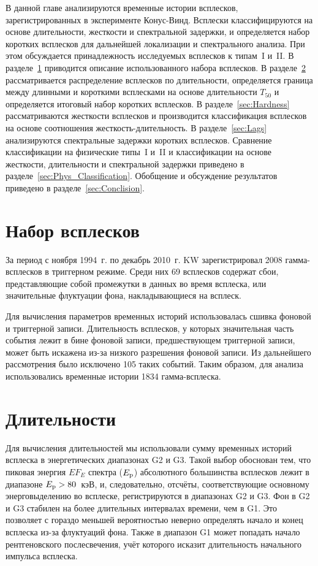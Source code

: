 В данной главе анализируются временные истории всплесков, зарегистрированных в 
эксперименте Конус-Винд. Всплески классифицируются на основе длительности, жесткости и 
спектральной задержки, и определяется набор коротких всплесков для дальнейшей локализации и спектрального анализа. 
При этом обсуждается принадлежность исследуемых всплесков к типам~I и~II. 
В разделе~\ref{sec:GRB_sample} приводится описание использованного набора всплесков. 
В разделе~\ref{sec:Durations} рассматривается распределение всплесков по длительности, 
определяется граница между длинными и короткими всплесками на основе 
длительности $T_{50}$ и определяется итоговый набор коротких всплесков. 
В разделе~\ref{sec:Hardness} рассматриваются жесткости всплесков и производится 
классификация всплесков на основе соотношения жесткость-длительность. 
В разделе~\ref{sec:Lags} анализируются спектральные задержки коротких всплесков. 
Сравнение классификации на физические типы~I и~II и классификации на основе жесткости, 
длительности и спектральной задержки приведено в разделе~\ref{sec:Phys_Classification}. 
Обобщение и обсуждение результатов приведено в разделе~\ref{sec:Conclision}.  

\section{Набор всплесков}\label{sec:GRB_sample}
За период с ноября 1994~г. по декабрь 2010~г. KW зарегистрировал 2008 гамма-всплесков 
в триггерном режиме. Среди них 69 всплесков содержат сбои, представляющие собой 
промежутки в данных во время всплеска, или значительные флуктуации фона, 
накладывающиеся на всплеск. 

Для вычисления параметров временных историй использовалась 
сшивка фоновой и триггерной записи. Длительность всплесков, у которых значительная 
часть события лежит в бине фоновой записи, предшествующем триггерной записи, может быть 
искажена из-за низкого разрешения фоновой записи. Из дальнейшего рассмотрения 
было исключено 105 таких событий. Таким образом, для анализа использовались временные 
истории 1834 гамма-всплеска. 

\section{Длительности}\label{sec:Durations}
Для вычисления длительностей мы использовали сумму временных историй всплеска 
в энергетических диапазонах G2 и G3. Такой выбор обоснован тем, что  пиковая 
энергия $E F_{E}$ спектра ($E_{\mathrm{p}}$) абсолютного большинства всплесков лежит в 
диапазоне $E_{\mathrm{p}}>80$~кэВ, и, следовательно, отсчёты, соответствующие основному энерговыделению 
во всплеске, регистрируются в диапазонах G2 и G3. Фон в G2 и G3 стабилен на более 
длительных интервалах времени, чем в G1. Это позволяет с гораздо меньшей вероятностью 
неверно определять начало и конец всплеска из-за флуктуаций фона. Также в диапазон G1 
может попадать начало рентгеновского послесвечения, учёт которого исказит 
длительность начального импульса всплеска.

